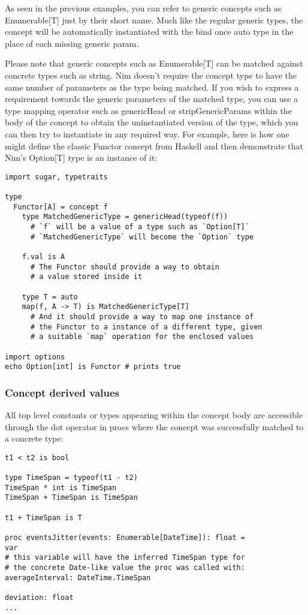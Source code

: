 As seen in the previous examples, you can refer to generic concepts such
as {Enumerable{[}T{]}} just by their short name. Much like the regular
generic types, the concept will be automatically instantiated with the
bind once auto type in the place of each missing generic param.

Please note that generic concepts such as {Enumerable{[}T{]}} can be
matched against concrete types such as {string}. Nim doesn't require the
concept type to have the same number of parameters as the type being
matched. If you wish to express a requirement towards the generic
parameters of the matched type, you can use a type mapping operator such
as {genericHead} or {stripGenericParams} within the body of the concept
to obtain the uninstantiated version of the type, which you can then try
to instantiate in any required way. For example, here is how one might
define the classic {Functor} concept from Haskell and then demonstrate
that Nim's {Option{[}T{]}} type is an instance of it:

\begin{verbatim}
import sugar, typetraits

type
  Functor[A] = concept f
    type MatchedGenericType = genericHead(typeof(f))
      # `f` will be a value of a type such as `Option[T]`
      # `MatchedGenericType` will become the `Option` type

    f.val is A
      # The Functor should provide a way to obtain
      # a value stored inside it

    type T = auto
    map(f, A -> T) is MatchedGenericType[T]
      # And it should provide a way to map one instance of
      # the Functor to a instance of a different type, given
      # a suitable `map` operation for the enclosed values

import options
echo Option[int] is Functor # prints true
\end{verbatim}

\hypertarget{concept-derived-values}{%
\subsubsection{Concept derived values}\label{concept-derived-values}}

All top level constants or types appearing within the concept body are
accessible through the dot operator in procs where the concept was
successfully matched to a concrete type:

\begin{verbatim}
t1 < t2 is bool

type TimeSpan = typeof(t1 - t2)
TimeSpan * int is TimeSpan
TimeSpan + TimeSpan is TimeSpan

t1 + TimeSpan is T

proc eventsJitter(events: Enumerable[DateTime]): float =
var
# this variable will have the inferred TimeSpan type for
# the concrete Date-like value the proc was called with:
averageInterval: DateTime.TimeSpan

deviation: float
...
\end{verbatim}


